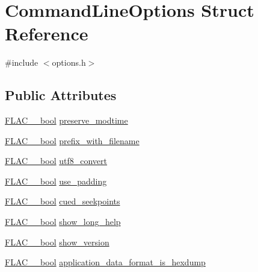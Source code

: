 \hypertarget{struct_command_line_options}{}\section{Command\+Line\+Options Struct Reference}
\label{struct_command_line_options}


{\ttfamily \#include $<$options.\+h$>$}

\subsection*{Public Attributes}
\begin{DoxyCompactItemize}
\item 
\hyperlink{ordinals_8h_a95103469f1cbd78b8cf250194985b34e}{F\+L\+A\+C\+\_\+\+\_\+bool} \hyperlink{struct_command_line_options_a525615f0b561d79e609223de5e940735}{preserve\+\_\+modtime}
\item 
\hyperlink{ordinals_8h_a95103469f1cbd78b8cf250194985b34e}{F\+L\+A\+C\+\_\+\+\_\+bool} \hyperlink{struct_command_line_options_a74e9c52811f32532f0b12dc4c639f8dd}{prefix\+\_\+with\+\_\+filename}
\item 
\hyperlink{ordinals_8h_a95103469f1cbd78b8cf250194985b34e}{F\+L\+A\+C\+\_\+\+\_\+bool} \hyperlink{struct_command_line_options_afd2f4579cce9cd358877e5d2e788d2c2}{utf8\+\_\+convert}
\item 
\hyperlink{ordinals_8h_a95103469f1cbd78b8cf250194985b34e}{F\+L\+A\+C\+\_\+\+\_\+bool} \hyperlink{struct_command_line_options_affd978b1a0bece3d9bf35fdc1550280e}{use\+\_\+padding}
\item 
\hyperlink{ordinals_8h_a95103469f1cbd78b8cf250194985b34e}{F\+L\+A\+C\+\_\+\+\_\+bool} \hyperlink{struct_command_line_options_aca486ada1f981583a0f9c3ed8614e80b}{cued\+\_\+seekpoints}
\item 
\hyperlink{ordinals_8h_a95103469f1cbd78b8cf250194985b34e}{F\+L\+A\+C\+\_\+\+\_\+bool} \hyperlink{struct_command_line_options_a446f5389fefc4ef51ebff657b51c04c6}{show\+\_\+long\+\_\+help}
\item 
\hyperlink{ordinals_8h_a95103469f1cbd78b8cf250194985b34e}{F\+L\+A\+C\+\_\+\+\_\+bool} \hyperlink{struct_command_line_options_a5cf36cf06365b75a75eeb7b8c03a8800}{show\+\_\+version}
\item 
\hyperlink{ordinals_8h_a95103469f1cbd78b8cf250194985b34e}{F\+L\+A\+C\+\_\+\+\_\+bool} \hyperlink{struct_command_line_options_a39a4636db242a0d1ef18f29dba7e634a}{application\+\_\+data\+\_\+format\+\_\+is\+\_\+hexdump}
\item 

\end{DoxyCompactItemize}
